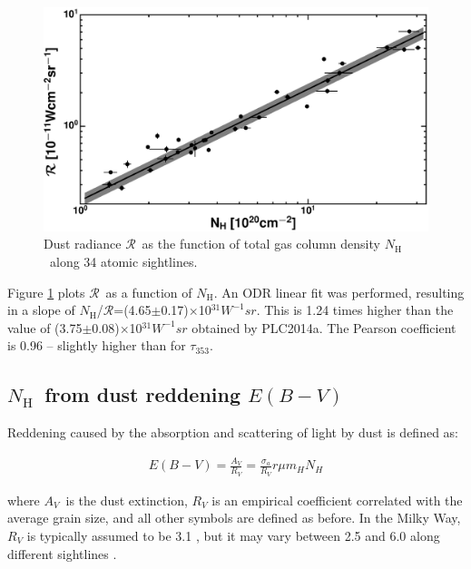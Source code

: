 \documentclass[preprint]{emulateapj}
\def\av{$A_{V}$}
\def\ebv{$E(B{-}V)$}
\def\NH{$N_\mathrm{H}$}
\def\t353{$\tau_{353}$}
\def\rad{$\mathcal{R}$}
\begin{document}
\begin{figure}
\includegraphics[width=1.0\linewidth]{fig/r_vs_nh.eps}
\caption{Dust radiance \rad\ as the function of total gas column density \NH\ along 34 atomic sightlines.}
\label{fig:r_vs_nh}
\end{figure}

Figure \ref{fig:r_vs_nh} plots \rad\ as a function of \NH. An ODR linear fit was performed, resulting in a slope of \NH/\rad=(4.65$\pm$0.17)$\times$10$^{31}$$W^{-1}sr$. {\color{magenta} This is 1.24 times higher than} the value of (3.75$\pm$0.08)$\times$10$^{31}$$W^{-1}sr$ obtained by PLC2014a. The Pearson coefficient is 0.96 -- slightly higher than for \t353. 

\subsection{ \NH\ from dust reddening \ebv}
\label{subsec:nh-from-ebv}
Reddening caused by the absorption and scattering of light by dust %
is defined as:

\begin{equation}
\begin{split}
E(B{-}V) = \frac{A_{V}}{R_{V}} = \frac{ \sigma_{a} }{ R_{V} } r \mu  m_{H} N_{H}
\end{split}
\end{equation}

\noindent where \av\ is the dust extinction, $R_V$ is an empirical coefficient correlated with the average grain size, %
and all other symbols are defined as before. In the Milky Way, $R_{V}$ is typically {\color{magenta} assumed to be} 3.1 \citep{Schultz1975}, but it may vary between 2.5 and 6.0 along different sightlines \citep{Goodman1995,Draine2003}.
\end{document}
